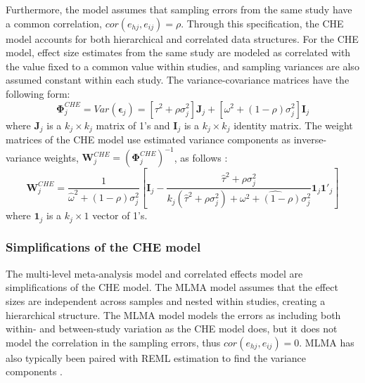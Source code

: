 Furthermore, the model assumes that sampling errors from the same study have a common correlation, $cor(e_{hj}, e_{ij}) = \rho$. Through this specification, the CHE model accounts for both hierarchical and correlated data structures. For the CHE model, effect size estimates from the same study are modeled as correlated with the value fixed to a common value within studies, and sampling variances are also assumed constant within each study. The variance-covariance matrices have the following form:
\begin{equation}
    \mathbf{\Phi}_j^{CHE} = Var(\mathbf{\epsilon}_j) =[\tau^2 + \rho \sigma^2_j]\mathbf{J}_j +[\omega^2 + (1- \rho)\sigma_j^2]\mathbf{I}_j
\end{equation}
where $\mathbf{J}_j$ is a $k_j \times k_j$ matrix of 1's and $\mathbf{I}_j$ is a $k_j \times k_j$ identity matrix. The weight matrices of the CHE model use estimated variance components as inverse-variance weights, $\mathbf{W}^{CHE}_j = (\mathbf{\Phi}_j^{CHE})^{-1}$, as follows \autocite{tipton2015b}: 
\begin{equation}\label{CHE Weight Matrix}
    \mathbf{W}_j^{CHE} = \frac{1}{\hat{\omega}^2 + (1-\rho)\sigma^2_j} \left[ \mathbf{I}_j - \frac{\hat{\tau}^2+ \rho\sigma^2_j}{k_j(\hat{\tau}^2+\rho\sigma^2_j) + \hat{\omega^2 + (1-\rho)\sigma^2_j}} \mathbf{1}_j \mathbf{1}'_j\right]
\end{equation}
where $\mathbf{1}_j$ is a $k_j \times 1$ vector of 1's.  






\subsubsection{Simplifications of the CHE model} 

The multi-level meta-analysis model \autocite[MLMA;][]{vandennoortgate2013, vandennoortgate2015} and correlated effects model \autocite[CE;][]{hedges2010} are simplifications of the CHE model. The MLMA model assumes that the effect sizes are independent across samples and nested within studies, creating a hierarchical structure. The MLMA model models the errors as including both within- and between-study variation as the CHE model does, but it does not model the correlation in the sampling errors, thus $cor(e_{hj}, e_{ij}) = 0$. MLMA has also typically been paired with REML estimation to find the variance components \autocite{pustejovsky2022}. 

